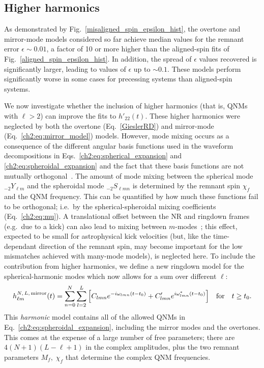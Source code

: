 \subsection{Higher harmonics}\label{kitchen-sink}

As demonstrated by Fig.~\ref{misaligned_spin_epsilon_hist}, %
the overtone and mirror-mode models considered so far achieve median values for the remnant error $\epsilon \sim 0.01$, a factor of 10 or more higher than the aligned-spin fits of Fig.~\ref{aligned_spin_epsilon_hist}. In addition, the spread of $\epsilon$ values recovered is significantly larger, leading to values of $\epsilon$ up to $\sim 0.1$. 
These models perform significantly worse in some cases for precessing systems than aligned-spin systems.

We now investigate whether the inclusion of higher harmonics (that is, QNMs with $\ell > 2$) can improve the fits to $h'_{22}(t)$.
These higher harmonics were neglected by both the overtone (Eq.~\ref{GieslerRD}) and mirror-mode (Eq.~\ref{ch2:eq:mirror_model}) models.
However, mode mixing occurs as a consequence of the different angular basis functions used in the waveform decompositions in Eqs.~\ref{ch2:eq:spherical_expansion} and \ref{ch2:eq:spheroidal_expansion} and the fact that these basis functions are not mutually orthogonal~\cite{Berti:2014fga}.
The amount of mode mixing between the spherical mode ${}_{-2}Y_{\ell m}$ and the spheroidal mode ${}_{-2}S_{\ell m n}$ is determined by the remnant spin $\chi_f$ and the QNM frequency. This can be quantified by how much these functions fail to be orthogonal; i.e.\ by the spherical-spheroidal mixing coefficients (Eq.~\ref{ch2:eq:mu}).
A translational offset between the NR and ringdown frames (e.g.\ due to a kick) can also lead to mixing between $m$-modes~\cite{Boyle:2015nqa}; this effect, expected to be small for astrophysical kick velocities (but, like the time-dependant direction of the remnant spin, may become important for the low mismatches achieved with many-mode models), is neglected here.
To include the contribution from higher harmonics, we define a new ringdown model for the spherical-harmonic modes which now allows for a sum over different $\ell$:
\begin{equation}\label{full_ringdown}
    h_{\ell m}^{N,\,L,\, {\rm mirror}}(t) = \sum_{n=0}^N \sum_{l=2}^{L} \qty[ C_{l m n} e^{-i \omega_{l m n}(t-t_0)} + C'_{l m n} e^{i \omega^*_{l m n}(t-t_0)} ]\quad \textrm{for} \quad t \geq t_0.
\end{equation}
This \emph{harmonic} model contains all of the allowed QNMs in Eq.~\ref{ch2:eq:spheroidal_expansion}, including the mirror modes and the overtones.
This comes at the expense of a large number of free parameters; there are $4(N+1)(L-\ell+1)$ in the complex amplitudes, plus the two remnant parameters $M_f,\; \chi_f$ that determine the complex QNM frequencies.

